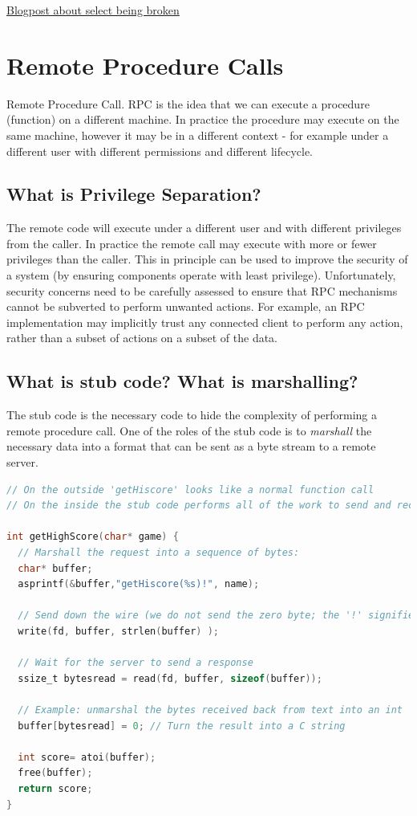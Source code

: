 \href{https://idea.popcount.org/2017-01-06-select-is-fundamentally-broken/}{Blogpost about select being broken}

\section{Remote Procedure Calls}\label{what-is-rpc}

Remote Procedure Call. RPC is the idea that we can execute a procedure (function) on a different machine. In practice the procedure may execute on the same machine, however it may be in a different context - for example under a different user with different permissions and different lifecycle.

\subsection{What is Privilege Separation?}\label{what-is-privilege-separation}

The remote code will execute under a different user and with different privileges from the caller. In practice the remote call may execute with more or fewer privileges than the caller. This in principle can be used to improve the security of a system (by ensuring components operate with least privilege). Unfortunately, security concerns need to be carefully assessed to ensure that RPC mechanisms cannot be subverted to perform unwanted actions. For example, an RPC implementation may implicitly trust any connected client to perform any action, rather than a subset of actions on a subset of the data.

\subsection{What is stub code? What is marshalling?}\label{what-is-stub-code-what-is-marshalling}

The stub code is the necessary code to hide the complexity of performing a remote procedure call. One of the roles of the stub code is to \emph{marshall} the necessary data into a format that can be sent as a byte stream to a remote server.

\begin{lstlisting}[language=C]
// On the outside 'getHiscore' looks like a normal function call
// On the inside the stub code performs all of the work to send and receive the data to and from the remote machine.

int getHighScore(char* game) {
  // Marshall the request into a sequence of bytes:
  char* buffer;
  asprintf(&buffer,"getHiscore(%s)!", name);

  // Send down the wire (we do not send the zero byte; the '!' signifies the end of the message)
  write(fd, buffer, strlen(buffer) );

  // Wait for the server to send a response
  ssize_t bytesread = read(fd, buffer, sizeof(buffer));

  // Example: unmarshal the bytes received back from text into an int
  buffer[bytesread] = 0; // Turn the result into a C string

  int score= atoi(buffer);
  free(buffer);
  return score;
}
\end{lstlisting}

